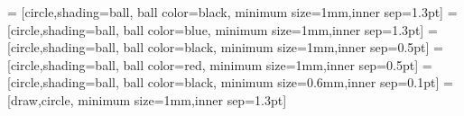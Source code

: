 \usepackage{tikz}
\usetikzlibrary{shapes.misc, positioning}
\usepackage{pgfplots}
\pgfplotsset{compat=1.13}
\usetikzlibrary{decorations.markings,shapes.geometric}
 = [circle,shading=ball, ball color=black,
minimum size=1mm,inner sep=1.3pt]
 = [circle,shading=ball, ball color=blue,
minimum size=1mm,inner sep=1.3pt]
 = [circle,shading=ball, ball color=black,
minimum size=1mm,inner sep=0.5pt]
 = [circle,shading=ball, ball color=red,
minimum size=1mm,inner sep=0.5pt]
 = [circle,shading=ball, ball color=black,
minimum size=0.6mm,inner sep=0.1pt]
 = [draw,circle, minimum size=1mm,inner sep=1.3pt]

\usepackage{needspace}  %

\usepackage{enumitem}


\usepackage{outlines}



	
	


